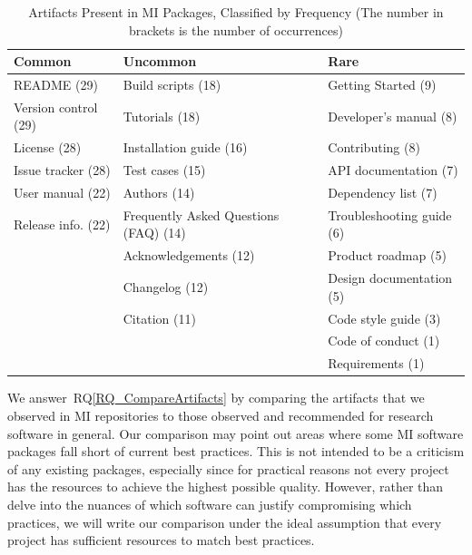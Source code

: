 \documentclass[11pt]{article}
\newcommand{\rqref}[1]{RQ\ref{#1}}
\begin{document}
\begin{table}[ht!]
    \begin{center}
    \begin{tabular}{ p{4.6 cm} p{5.6 cm} p{5 cm}}
    \toprule
    Common & Uncommon & Rare \\
    \midrule
    README (29) & Build scripts (18) & Getting Started (9)\\
    Version control (29) & Tutorials (18) & Developer's manual (8)\\
    License (28) & Installation guide (16) & Contributing (8)\\
    Issue tracker (28) & Test cases (15) & API documentation (7)\\
    User manual (22) & Authors (14) & Dependency list (7)\\
    Release info. (22) & Frequently Asked Questions (FAQ) (14) & Troubleshooting guide (6)\\
     & Acknowledgements (12) & Product roadmap (5)\\
     & Changelog (12) & Design documentation (5)\\
     & Citation (11) & Code style guide (3)\\
     & & Code of conduct (1)\\
     & & Requirements (1)\\
    \bottomrule
    \end{tabular}
    \caption{Artifacts Present in MI Packages, Classified by Frequency (The number 
    in brackets is the number of occurrences)}
    \label{artifactspresent}
    \end{center}
\end{table}

We answer~\rqref{RQ_CompareArtifacts} by comparing the artifacts that we
observed in MI repositories to those observed and recommended for research
software in general. Our comparison may point out areas where some MI software
packages fall short of current best practices. This is not intended to be a
criticism of any existing packages, especially since for practical reasons not
every project has the resources to achieve the highest possible quality.
However, rather than delve into the nuances of which software can justify
compromising which practices, we will write our comparison under the ideal
assumption that every project has sufficient resources to match best practices.
    
\end{document}
